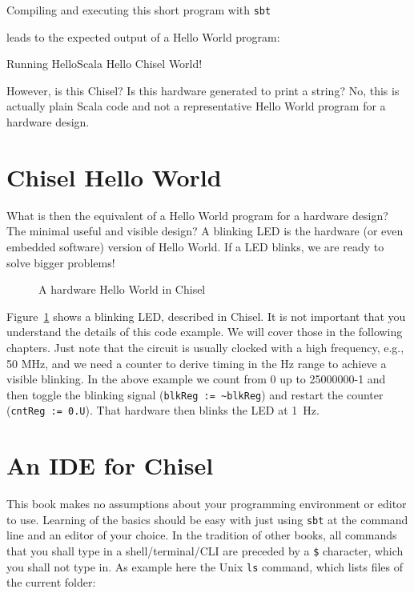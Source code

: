 \documentclass[%
    10pt, %
    headinclude, footexclude,
    openright, %
    notitlepage,
    cleardoubleempty,
    headsepline,
    pointlessnumbers,
    bibtotoc, idxtotoc,
    ]{scrbook}
\newcommand{\code}[1]{{\small{\texttt{#1}}}}
\begin{document}



\noindent Compiling and executing this short program with \code{sbt}


\noindent leads to the expected output of a Hello World program:

\begin{chisel}
[info] Running HelloScala
Hello Chisel World!
\end{chisel}

\noindent However, is this Chisel? Is this hardware generated to print a string?
No, this is actually plain Scala code and not a representative Hello World
program for a hardware design.

\section{Chisel Hello World}

What is then the equivalent of a Hello World program for a hardware design?
The minimal useful and visible design? A blinking LED is the hardware (or even
embedded software) version of Hello World. If a LED blinks, we are ready to
solve bigger problems!


\begin{figure}

\caption{A hardware Hello World in Chisel}
\label{fig:chisel:hello}
\end{figure}

Figure~\ref{fig:chisel:hello} shows a blinking LED, described in Chisel.
It is not important that you understand the details of this code example.
We will cover those in the following chapters. Just note that the circuit is
usually clocked with a high frequency, e.g., 50 MHz, and we need a counter
to derive timing in the Hz range to achieve a visible blinking. In the above
example we count from 0 up to 25000000-1 and then toggle the blinking signal
(\code{blkReg := \textasciitilde blkReg}) and restart the counter (\code{cntReg := 0.U}).
That hardware then blinks the LED at 1~Hz.

\section{An IDE for Chisel}

This book makes no assumptions about your programming environment or editor to use.
Learning of the basics should be easy with just using \code{sbt} at the command line
and an editor of your choice. In the tradition of other books, all commands that you
shall type in a shell/terminal/CLI are preceded by a \code{\$} character, which you
shall not type in. As example here the Unix \code{ls} command, which lists files of
the current folder:
\end{document}

